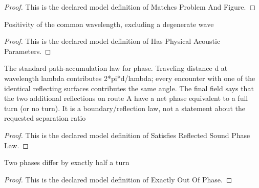 \begin{proof}
  This is the declared model definition of Matches Problem And Figure.
\end{proof}
\begin{definition}
  \label{def:physics:phyx-mini-0311:phyxminiproblems-problemphyxmini0311-hasphysicalacousticparameters}
  Positivity of the common wavelength, excluding a degenerate wave
\end{definition}
\begin{proof}
  This is the declared model definition of Has Physical Acoustic Parameters.
\end{proof}
\begin{definition}
  \label{def:physics:phyx-mini-0311:phyxminiproblems-problemphyxmini0311-satisfiesreflectedsoundphaselaw}
  The standard path-accumulation law for phase. Traveling distance d at wavelength lambda contributes 2*pi*d/lambda; every encounter with one of the identical reflecting surfaces contributes the same angle. The final field says that the two additional reflections on route A have a net phase equivalent to a full turn (or no turn). It is a boundary/reflection law, not a statement about the requested separation ratio
\end{definition}
\begin{proof}
  This is the declared model definition of Satisfies Reflected Sound Phase Law.
\end{proof}
\begin{definition}
  \label{def:physics:phyx-mini-0311:phyxminiproblems-problemphyxmini0311-exactlyoutofphase}
  Two phases differ by exactly half a turn
\end{definition}
\begin{proof}
  This is the declared model definition of Exactly Out Of Phase.
\end{proof}
